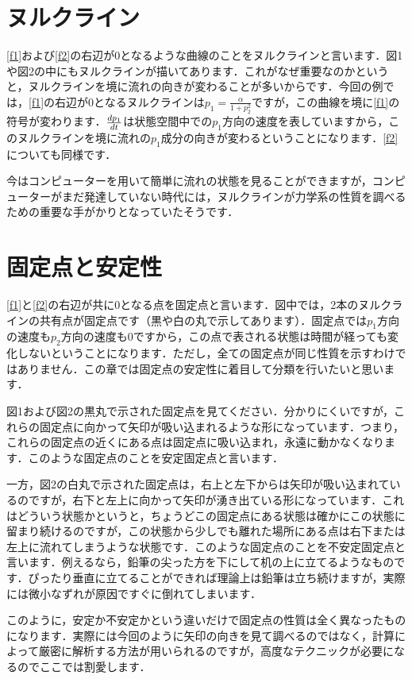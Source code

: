 \documentclass[platex,dvipdfmx, a5paper]{jlreq}			%
\begin{document}
\section{ヌルクライン}
\eqref{f1}および\eqref{f2}の右辺が0となるような曲線のことをヌルクラインと言います．図1や図2の中にもヌルクラインが描いてあります．これがなぜ重要なのかというと，ヌルクラインを境に流れの向きが変わることが多いからです．今回の例では，\eqref{f1}の右辺が0となるヌルクラインは$p_1 = \frac{\alpha}{1 + p_2^2}$ですが，この曲線を境に\eqref{f1}の符号が変わります．$\dv{p_1}{t}$は状態空間中での$p_1$方向の速度を表していますから，このヌルクラインを境に流れの$p_1$成分の向きが変わるということになります．\eqref{f2}についても同様です．

今はコンピューターを用いて簡単に流れの状態を見ることができますが，コンピューターがまだ発達していない時代には，ヌルクラインが力学系の性質を調べるための重要な手がかりとなっていたそうです．
\section{固定点と安定性}
\eqref{f1}と\eqref{f2}の右辺が共に0となる点を固定点と言います．図中では，2本のヌルクラインの共有点が固定点です（黒や白の丸で示してあります）．固定点では$p_1$方向の速度も$p_2$方向の速度も0ですから，この点で表される状態は時間が経っても変化しないということになります．ただし，全ての固定点が同じ性質を示すわけではありません．この章では固定点の安定性に着目して分類を行いたいと思います．

図1および図2の黒丸で示された固定点を見てください．分かりにくいですが，これらの固定点に向かって矢印が吸い込まれるような形になっています．つまり，これらの固定点の近くにある点は固定点に吸い込まれ，永遠に動かなくなります．このような固定点のことを安定固定点と言います．

一方，図2の白丸で示された固定点は，右上と左下からは矢印が吸い込まれているのですが，右下と左上に向かって矢印が湧き出ている形になっています．これはどういう状態かというと，ちょうどこの固定点にある状態は確かにこの状態に留まり続けるのですが，この状態から少しでも離れた場所にある点は右下または左上に流れてしまうような状態です．このような固定点のことを不安定固定点と言います．例えるなら，鉛筆の尖った方を下にして机の上に立てるようなものです．ぴったり垂直に立てることができれば理論上は鉛筆は立ち続けますが，実際には微小なずれが原因ですぐに倒れてしまいます．

このように，安定か不安定かという違いだけで固定点の性質は全く異なったものになります．実際には今回のように矢印の向きを見て調べるのではなく，計算によって厳密に解析する方法が用いられるのですが，高度なテクニックが必要になるのでここでは割愛します．
\end{document}
